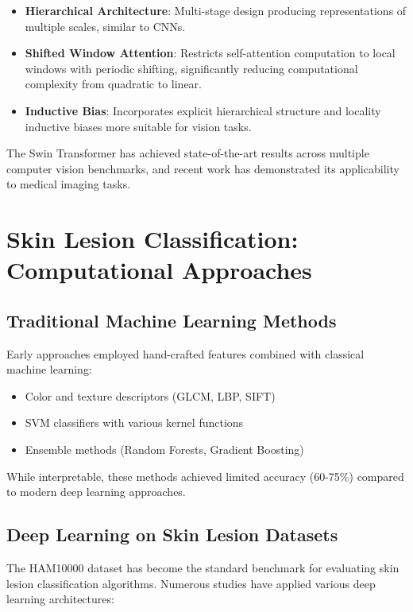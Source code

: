 \begin{itemize}
    \item \textbf{Hierarchical Architecture}: Multi-stage design producing representations of multiple scales, similar to CNNs.
    
    \item \textbf{Shifted Window Attention}: Restricts self-attention computation to local windows with periodic shifting, significantly reducing computational complexity from quadratic to linear.
    
    \item \textbf{Inductive Bias}: Incorporates explicit hierarchical structure and locality inductive biases more suitable for vision tasks.
\end{itemize}

The Swin Transformer has achieved state-of-the-art results across multiple computer vision benchmarks, and recent work \cite{chen2021swin} has demonstrated its applicability to medical imaging tasks.

\section{Skin Lesion Classification: Computational Approaches}

\subsection{Traditional Machine Learning Methods}

Early approaches employed hand-crafted features combined with classical machine learning:

\begin{itemize}
    \item Color and texture descriptors (GLCM, LBP, SIFT)
    \item SVM classifiers with various kernel functions
    \item Ensemble methods (Random Forests, Gradient Boosting)
\end{itemize}

While interpretable, these methods achieved limited accuracy (60-75\%) compared to modern deep learning approaches.

\subsection{Deep Learning on Skin Lesion Datasets}

The HAM10000 dataset \cite{tschandl2018ham10000} has become the standard benchmark for evaluating skin lesion classification algorithms. Numerous studies have applied various deep learning architectures:

